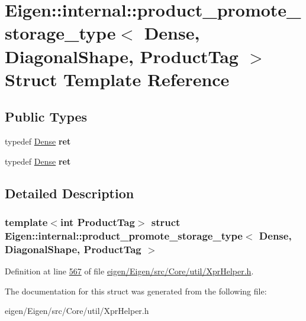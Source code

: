 \hypertarget{struct_eigen_1_1internal_1_1product__promote__storage__type_3_01_dense_00_01_diagonal_shape_00_01_product_tag_01_4}{}\section{Eigen\+:\+:internal\+:\+:product\+\_\+promote\+\_\+storage\+\_\+type$<$ Dense, Diagonal\+Shape, Product\+Tag $>$ Struct Template Reference}
\label{struct_eigen_1_1internal_1_1product__promote__storage__type_3_01_dense_00_01_diagonal_shape_00_01_product_tag_01_4}
\subsection*{Public Types}
\begin{DoxyCompactItemize}
\item 
\mbox{\label{struct_eigen_1_1internal_1_1product__promote__storage__type_3_01_dense_00_01_diagonal_shape_00_01_product_tag_01_4_acc40c9c92bbe0fa39119e1f13bdf3c7a}} 
typedef \hyperlink{struct_eigen_1_1_dense}{Dense} {\bfseries ret}
\item 
\mbox{\label{struct_eigen_1_1internal_1_1product__promote__storage__type_3_01_dense_00_01_diagonal_shape_00_01_product_tag_01_4_acc40c9c92bbe0fa39119e1f13bdf3c7a}} 
typedef \hyperlink{struct_eigen_1_1_dense}{Dense} {\bfseries ret}
\end{DoxyCompactItemize}


\subsection{Detailed Description}
\subsubsection*{template$<$int Product\+Tag$>$\newline
struct Eigen\+::internal\+::product\+\_\+promote\+\_\+storage\+\_\+type$<$ Dense, Diagonal\+Shape, Product\+Tag $>$}



Definition at line \hyperlink{eigen_2_eigen_2src_2_core_2util_2_xpr_helper_8h_source_l00567}{567} of file \hyperlink{eigen_2_eigen_2src_2_core_2util_2_xpr_helper_8h_source}{eigen/\+Eigen/src/\+Core/util/\+Xpr\+Helper.\+h}.



The documentation for this struct was generated from the following file\+:\begin{DoxyCompactItemize}
\item 
eigen/\+Eigen/src/\+Core/util/\+Xpr\+Helper.\+h\end{DoxyCompactItemize}

